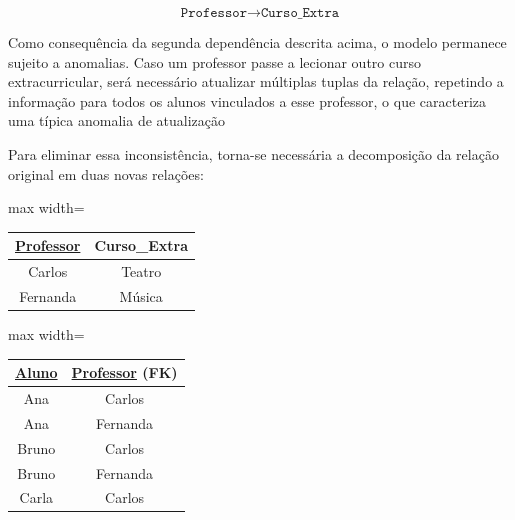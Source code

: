 \begin{tcolorbox}[breakable, colback=blue!5,colframe=blue!40!black,title=Situação exemplo]
\[
\texttt{Professor} \rightarrow \texttt{Curso\_Extra}
\]

Como consequência da segunda dependência descrita acima, o modelo permanece sujeito a anomalias. Caso um professor passe a lecionar outro curso extracurricular, será necessário atualizar múltiplas tuplas da relação, repetindo a informação para todos os alunos vinculados a esse professor, o que caracteriza uma típica anomalia de atualização

Para eliminar essa inconsistência, torna-se necessária a decomposição da relação original em duas novas relações:

\vspace{0.5cm}

\centering
\renewcommand{\arraystretch}{1.2}

\begin{adjustbox}{max width=\textwidth}
\begin{tabular}{|c|c|}
\hline
\textbf{\underline{Professor}} & \textbf{Curso\_Extra} \\ \hline
Carlos & Teatro \\ \hline
Fernanda & Música \\ \hline
\end{tabular}
\end{adjustbox}
\vspace{0.3cm}
\label{tab:bcnf_professor_curso}

\vspace{0.5cm}

\begin{adjustbox}{max width=\textwidth}
\begin{tabular}{|c|c|}
\hline
\textbf{\underline{Aluno}} & \textbf{\underline{Professor} (FK)} \\ \hline
Ana & Carlos \\ \hline
Ana & Fernanda \\ \hline
Bruno & Carlos \\ \hline
Bruno & Fernanda \\ \hline
Carla & Carlos \\ \hline
\end{tabular}
\end{adjustbox}
\vspace{0.3cm}
\label{tab:bcnf_aluno_professor}

\vspace{0.4cm}


\end{tcolorbox}

